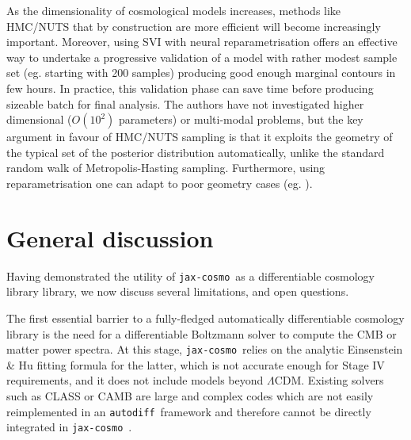 \documentclass[twocolumn,twocolappendix,nofootinbib,iop]{openjournal}
\newcommand{\JZ}[1]{{\color{purple}JZ: #1}}
\newcommand{\jaxcosmo}{\texttt{jax-cosmo}}
\newcommand{\autodiff}{\texttt{autodiff}}
\begin{document}


As the dimensionality of cosmological models increases, methods like HMC/NUTS that by construction are more efficient will become increasingly important. Moreover, using SVI with neural reparametrisation offers an effective way to undertake a progressive validation of a model with rather modest sample set (eg. starting with 200 samples) producing good enough marginal contours in few hours. In practice, this validation phase can save time before producing sizeable batch for final analysis. The authors have not investigated higher dimensional ($O(10^2)$ parameters) or multi-modal problems, but the key argument in favour of HMC/NUTS sampling is that it exploits the geometry of the typical set of the posterior distribution automatically, unlike the standard random walk of Metropolis-Hasting sampling. Furthermore, using reparametrisation  one can adapt to poor geometry cases (eg. \cite{2019arXiv190303704H}).
%

%
\section{General discussion}
\label{sec-discussion}
%
Having demonstrated the utility of \jaxcosmo\ as a differentiable cosmology library library, we now discuss several limitations, and open questions.

The first essential barrier to a fully-fledged automatically differentiable cosmology library is the need for a differentiable Boltzmann solver to compute the CMB or matter power spectra. At this stage, \jaxcosmo\ relies on the analytic Einsenstein \& Hu fitting formula for the latter, which is not accurate enough for Stage IV requirements, and it does not include models beyond $\Lambda$CDM. Existing solvers such as CLASS or CAMB \citep{2011JCAP...07..034B,camb} are large and complex codes which are not easily reimplemented in an \autodiff\ framework and therefore cannot be directly integrated in \jaxcosmo\ .
\end{document}
